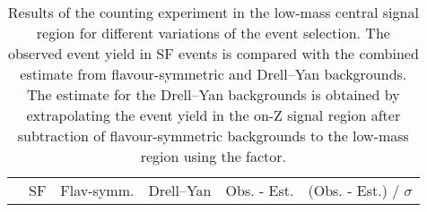 
\begin{table}[hbtp]
 \renewcommand{\arraystretch}{1.3}
 \setlength{\belowcaptionskip}{6pt}
 \centering
 \caption{Results of the counting experiment in the low-mass central signal region for different variations of the event selection. The observed event yield in SF events is compared with the combined estimate from flavour-symmetric and Drell--Yan backgrounds. The estimate for the Drell--Yan backgrounds is obtained by extrapolating the event yield in the on-Z signal region after subtraction of flavour-symmetric backgrounds to the low-mass region using the \Routin factor.}
  \label{tab:CountingCrosschecks}
  \begin{tabular}{l|c|c|c|c|c}
                                &  SF        & Flav-symm.  &  Drell--Yan  & Obs. - Est. & (Obs. - Est.) / $\sigma$\\ 


\end{tabular}
\end{table}
